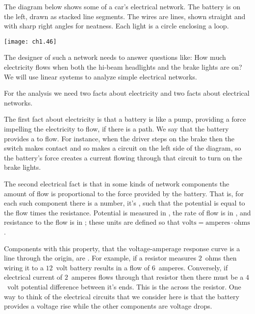 The diagram below shows some of a car's electrical network.
The battery is on the left, drawn as stacked line segments. 
The wires are lines, shown straight and with sharp right angles
for neatness.
Each light is a circle enclosing a loop.
\begin{center}
  \texttt{[image: ch1.46]}
\end{center}
The designer of such a network needs to answer questions like: 
How much electricity flows 
when both the hi-beam headlights and the brake lights are on?
We will use linear systems to analyze simple 
electrical networks. 

For the analysis we need two facts about electricity 
and two facts about electrical networks.

The first fact about electricity is that a battery is like a pump,  
providing a force impelling the electricity to flow, if there is a path.  
We say that the battery provides a 
to flow.
For instance, when the driver steps on the brake then the switch makes contact
and so makes a circuit on the left side of the
diagram, so the battery's force creates a
current flowing through that circuit to
turn on the brake lights.

The second electrical fact is that in some 
kinds of network components
the amount of flow is proportional to the force provided by the battery.
That is, for each such component there is a number,  
it's ,
such that the potential is equal to the flow times the resistance.
Potential is measured in ,
the rate of flow is in ,
and resistance to the flow is in ;
these units are defined so that
$\mbox{volts}=\mbox{amperes}\cdot\mbox{ohms}$.

Components with this property,
that the voltage-amperage response curve is a line through the origin,
are .
For example, if a resistor measures $2$~ohms 
then wiring it to a $12$~volt battery 
results in a flow of $6$~amperes.
Conversely, if electrical current of
$2$~amperes flows through that resistor then there must be 
a $4$~volt potential difference between it's ends. 
This is the  across the 
resistor.
One way to think of the electrical circuits that we consider here
is that the battery provides a voltage rise while the other components 
are voltage drops.

